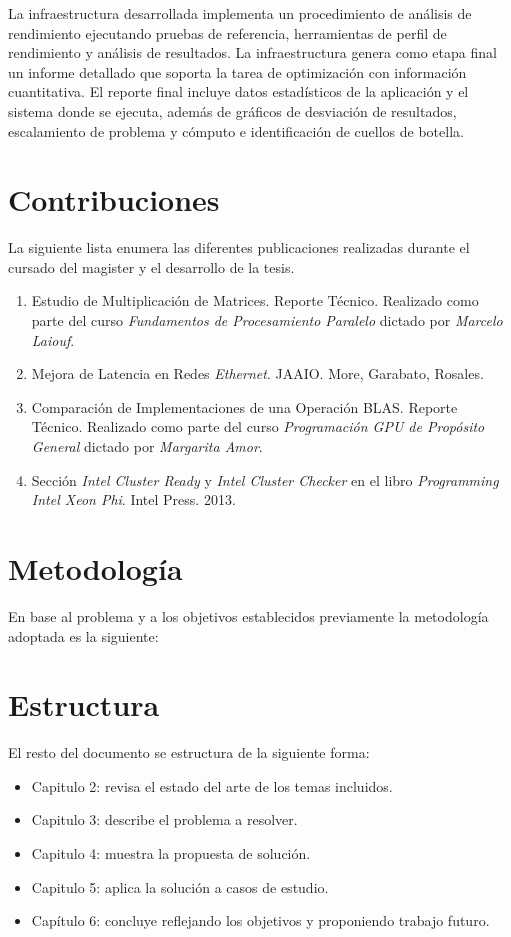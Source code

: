 \documentclass[a4paper]{report}
\begin{document}
\bigskip

La infraestructura desarrollada implementa un procedimiento de análisis de rendimiento ejecutando pruebas de referencia, herramientas de perfil de rendimiento y análisis de resultados. La infraestructura genera como etapa final un informe detallado que soporta la tarea de optimización con información cuantitativa.
El reporte final incluye datos estadísticos de la aplicación y el sistema donde se ejecuta, además de gráficos de desviación de resultados, escalamiento de problema y cómputo e identificación de cuellos de botella.

\section{Contribuciones}

La siguiente lista enumera las diferentes publicaciones realizadas durante el cursado del magister y el desarrollo de la tesis.

\begin{enumerate}
\item Estudio de Multiplicación de Matrices. Reporte Técnico. Realizado como parte del curso {\it Fundamentos de Procesamiento Paralelo} dictado por {\it Marcelo Laiouf}.
\item Mejora de Latencia en Redes {\it Ethernet}. JAAIO. More, Garabato, Rosales.
\item Comparación de Implementaciones de una Operación BLAS. Reporte Técnico. Realizado como parte del curso {\it Programación GPU de Propósito General} dictado por {\it Margarita Amor}.
\item Sección {\it Intel Cluster Ready} y {\it Intel Cluster Checker} en el libro {\it Programming Intel Xeon Phi}. Intel Press. 2013.
\end{enumerate}

\section{Metodología}

En base al problema y a los objetivos establecidos previamente la metodología adoptada es la siguiente:

\section{Estructura}

El resto del documento se estructura de la siguiente forma:

\begin{itemize}
\item Capitulo 2: revisa el estado del arte de los temas incluidos.
\item Capitulo 3: describe el problema a resolver.
\item Capitulo 4: muestra la propuesta de solución.
\item Capitulo 5: aplica la solución a casos de estudio.
\item Capítulo 6: concluye reflejando los objetivos y proponiendo trabajo futuro.
\end{itemize}
\end{document}
